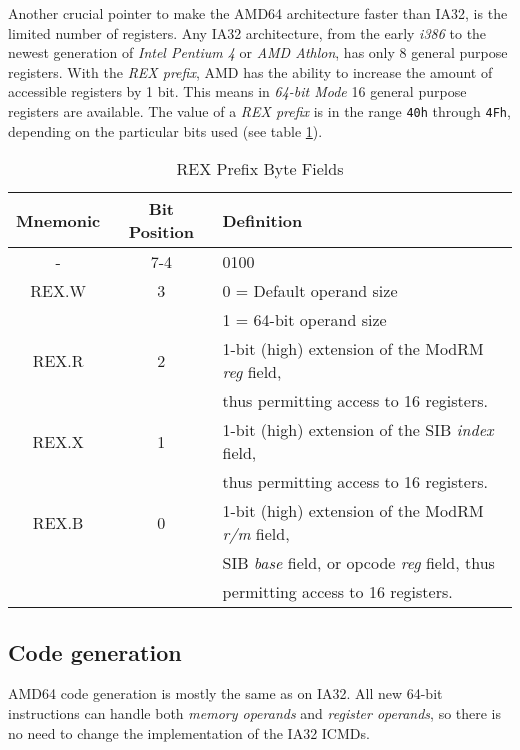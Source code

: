 Another crucial pointer to make the AMD64 architecture faster than
IA32, is the limited number of registers. Any IA32 architecture, from
the early \textit{i386} to the newest generation of \textit{Intel
Pentium 4} or \textit{AMD Athlon}, has only 8 general purpose
registers. With the \textit{REX prefix}, AMD has the ability to
increase the amount of accessible registers by 1 bit. This means in
\textit{64-bit Mode} 16 general purpose registers are available. The
value of a \textit{REX prefix} is in the range \texttt{40h} through
\texttt{4Fh}, depending on the particular bits used (see table
\ref{REX}).

\begin{table}
\begin{center}
\begin{tabular}[b]{|c|c|l|}
\hline
Mnemonic & Bit Position & Definition \\ \hline
-        & 7-4          & 0100 \\ \hline
REX.W    & 3            & 0 = Default operand size \\
         &              & 1 = 64-bit operand size \\ \hline
REX.R    & 2            & 1-bit (high) extension of the ModRM \textit{reg} field, \\
         &              & thus permitting access to 16 registers. \\ \hline
REX.X    & 1            & 1-bit (high) extension of the SIB \textit{index} field, \\
         &              & thus permitting access to 16 registers. \\ \hline
REX.B    & 0            & 1-bit (high) extension of the ModRM \textit{r/m} field, \\
         &              & SIB \textit{base} field, or opcode \textit{reg} field, thus \\
         &              & permitting access to 16 registers. \\ \hline
\end{tabular}
\caption{REX Prefix Byte Fields}
\label{REX}
\end{center}
\end{table}


\subsection{Code generation}

AMD64 code generation is mostly the same as on IA32. All new 64-bit
instructions can handle both \textit{memory operands} and
\textit{register operands}, so there is no need to change the
implementation of the IA32 ICMDs.

